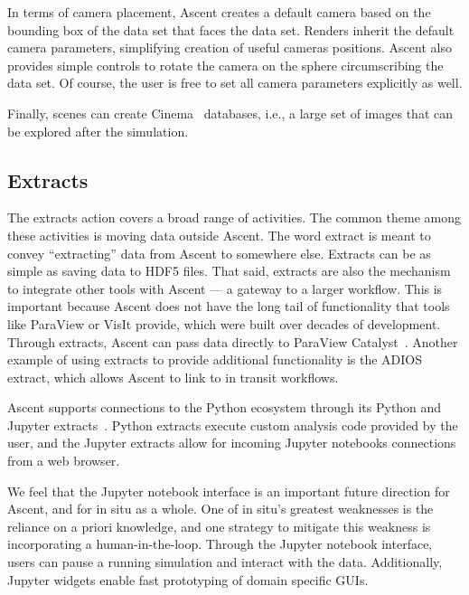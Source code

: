 In terms of camera placement,
Ascent creates a default camera based on the bounding box of the data set
that faces the data set.
%
Renders inherit the default camera parameters, simplifying creation of useful
cameras positions.
%
Ascent also provides simple controls to rotate the camera on the
sphere circumscribing the data set.
%
Of course, the user is free to set all
camera parameters explicitly as well.

Finally, scenes can create Cinema~\cite{AhrensCinema} databases, i.e.,
a large set of images that can be explored after the simulation.


\subsection{Extracts}
The extracts action covers a broad range of activities.
%
The common theme among these activities is moving data outside Ascent.
%
The word extract is meant to convey ``extracting'' data from Ascent to somewhere else.
%
%
%
Extracts can be as simple as saving data to HDF5 files.
%
That said, extracts are also the mechanism to integrate other tools with Ascent --- a gateway
to a larger workflow.
%
This is important because
Ascent does not have the long tail of functionality that tools like ParaView or VisIt provide, which
were built over decades of development.
%
Through extracts, Ascent can pass data directly to ParaView Catalyst~\cite{Catalyst}.
%
Another example of using extracts to provide additional functionality is the
ADIOS~\cite{Lofstead2008} extract, which allows Ascent to link to in transit workflows.

Ascent supports connections to the Python ecosystem through its Python and
Jupyter extracts~\cite{CyrusISAV,Jupyter}.
%
Python extracts execute custom analysis code provided by the user, and the
Jupyter extracts allow for incoming Jupyter notebooks connections from a web
browser.

We feel that the Jupyter notebook interface is an important future direction
for Ascent, and for in situ as a whole.
%
One of in situ's greatest weaknesses is the reliance on a priori
knowledge, and one strategy to mitigate this weakness is incorporating a human-in-the-loop.
%
Through the Jupyter notebook interface, users can pause a running simulation
and interact with the data.
%
Additionally, Jupyter widgets enable fast prototyping of domain specific GUIs.


